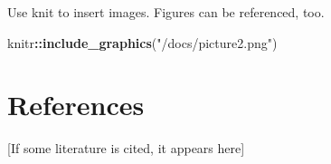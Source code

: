 \documentclass[11pt,a4paper,oneside]{article}
\newenvironment{Shaded}{\begin{snugshade}}{\end{snugshade}}
\newcommand{\KeywordTok}[1]{\textcolor[rgb]{0.13,0.29,0.53}{\textbf{#1}}}
\newcommand{\NormalTok}[1]{#1}
\newcommand{\OperatorTok}[1]{\textcolor[rgb]{0.81,0.36,0.00}{\textbf{#1}}}
\newcommand{\StringTok}[1]{\textcolor[rgb]{0.31,0.60,0.02}{#1}}
\begin{document}
Use knit to insert images. Figures can be referenced, too.

\begin{Shaded}
\begin{Highlighting}[]
\NormalTok{knitr}\OperatorTok{::}\KeywordTok{include_graphics}\NormalTok{(}\StringTok{"/docs/picture2.png"}\NormalTok{)}
\end{Highlighting}
\end{Shaded}

\hypertarget{references}{%
\section{References}\label{references}}

{[}If some literature is cited, it appears here{]}

\setlength{\parindent}{-0.5in}
\setlength{\leftskip}{0.5in}
\end{document}
